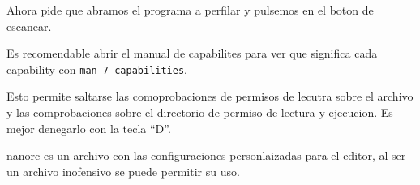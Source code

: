 \documentclass{article}
\begin{document}

Ahora pide que abramos el programa a perfilar y pulsemos en el boton de escanear.

Es recomendable abrir el manual de capabilites para ver que significa cada capability con \verb|man 7 capabilities|.


Esto permite saltarse las comoprobaciones de permisos de lecutra sobre el archivo y las comprobaciones sobre el directorio de permiso de lectura y ejecucion. Es mejor denegarlo con la tecla ``D''.

nanorc es un archivo con las configuraciones personlaizadas para el editor, al ser un archivo inofensivo se puede permitir su uso.
\end{document}
